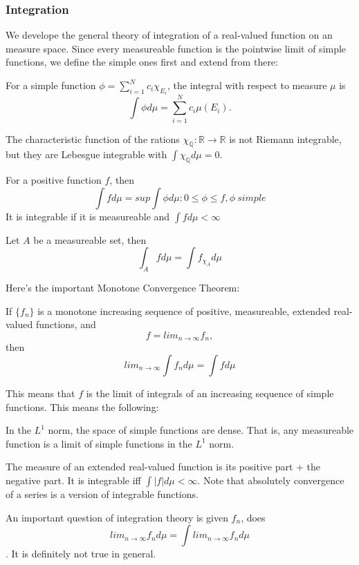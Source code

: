 \documentclass[main.tex]{subfiles}
\begin{document}
\subsubsection{Integration}

We develope the general theory of integration of a real-valued function on an measure space. Since every measureable function is the pointwise limit of simple functions, we define the simple ones first and extend from there:

For a simple function $\phi = \sum_{i = 1} ^N c_i \chi_{E_i}$, the integral with respect to measure $\mu$ is 
$$
\int \phi d\mu = \sum_{i = 1} ^N c_i \mu(E_i).
$$

\begin{example}
The characteristic function of the rations $\chi_\mathbb{Q}: \mathbb{R} \rightarrow \mathbb{R}$ is not Riemann integrable, but they are Lebesgue integrable with $\int \chi_\mathbb{Q} d\mu = 0$.
\end{example}

For a positive function $f$, then 
$$
\int f d\mu = sup{\int \phi d\mu: 0 \leq \phi \leq f, \phi \ simple}
$$
It is integrable if it is measureable and $\int f d\mu < \infty$


Let $A$ be a measureable set, then 
$$
\int_A f d\mu = \int f_{\chi_A}d\mu
$$

Here's the important Monotone Convergence Theorem:

\begin{theorem}
If $\{f_n\}$ is a monotone increasing sequence of positive, measureable, extended real-valued functions, and 
$$
f = lim_{n\rightarrow \infty} f_n,
$$
then 
$$
lim_{n \rightarrow \infty} \int f_n d\mu = \int f d\mu
$$
\end{theorem}

This means that $f$ is the limit of integrals of an increasing sequence of simple functions. This means the following:

\begin{lemma}
In the $L^1$ norm, the space of simple functions are dense. That is, any measureable function is a limit of simple functions in the $L^1$ norm.
\end{lemma}

The measure of an extended real-valued function is its positive part  + the negative part.
It is integrable iff $\int |f| d\mu < \infty$. Note that absolutely convergence of a series is a version of integrable functions.

An important question of integration theory is given $f_n$, does $$
lim_{n \rightarrow \infty} f_n d \mu = \int lim_{n \rightarrow \infty} f_n d \mu
$$.
It is definitely not true in general. 
\end{document}
